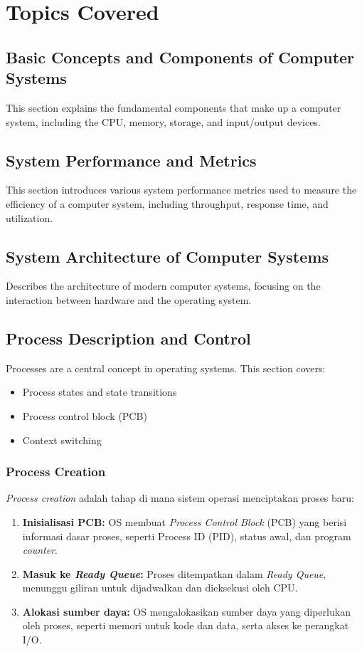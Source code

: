 \documentclass[12pt]{article}
\begin{document}
\section{Topics Covered}

\subsection{Basic Concepts and Components of Computer Systems}
This section explains the fundamental components that make up a computer system, including the CPU, memory, storage, and input/output devices.

\subsection{System Performance and Metrics}
This section introduces various system performance metrics used to measure the efficiency of a computer system, including throughput, response time, and utilization.

\subsection{System Architecture of Computer Systems}
Describes the architecture of modern computer systems, focusing on the interaction between hardware and the operating system.

\subsection{Process Description and Control}
Processes are a central concept in operating systems. This section covers:
\begin{itemize}
    \item Process states and state transitions
    \item Process control block (PCB)
    \item Context switching
\end{itemize}

\subsubsection{Process Creation}
\textit{Process creation} adalah tahap di mana sistem operasi menciptakan proses baru:
\begin{enumerate}
    \item \textbf{Inisialisasi PCB:} OS membuat \textit{Process Control Block} (PCB) yang berisi informasi dasar proses, seperti Process ID (PID), status awal, dan program \textit{counter}.
    \item \textbf{Masuk ke \textit{Ready Queue}:} Proses ditempatkan dalam \textit{Ready Queue}, menunggu giliran untuk dijadwalkan dan dieksekusi oleh CPU.
    \item \textbf{Alokasi sumber daya:} OS mengalokasikan sumber daya yang diperlukan oleh proses, seperti memori untuk kode dan data, serta akses ke perangkat I/O.
\end{enumerate}
\end{document}
